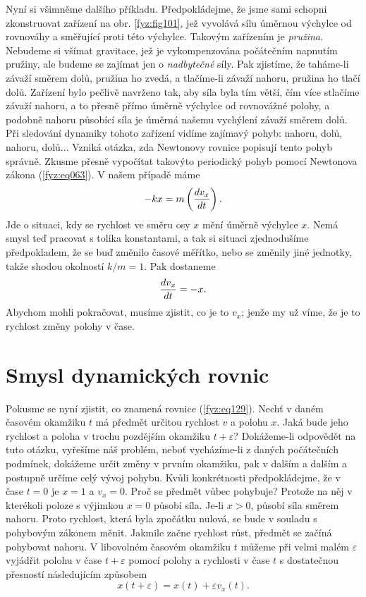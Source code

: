     Nyní si všimněme dalšího příkladu. Předpokládejme, že jsme sami schopni zkonstruovat zařízení na
    obr. \ref{fyz:fig101}, jež vyvolává sílu úměrnou výchylce od rovnováhy a směřující proti této 
    výchylce. Takovým zařízením je \emph{pružina}. Nebudeme si všímat gravitace, jež je 
    vykompenzována počátečním napnutím pružiny, ale budeme se zajímat jen o \emph{nadbytečné} síly. 
    Pak zjistíme, že taháme-li závaží směrem dolů, pružina ho zvedá, a tlačíme-li závaží nahoru, 
    pružina ho tlačí dolů. Zařízení bylo pečlivě navrženo tak, aby síla byla tím větší, čím více 
    stlačíme závaží nahoru, a to přesně přímo úměrně výchylce od rovnovážné polohy, a podobně 
    nahoru působící síla je úměrná našemu vychýlení závaží směrem dolů. Při sledování dynamiky 
    tohoto zařízení vidíme zajímavý pohyb: nahoru, dolů, nahoru, dolů... Vzniká otázka, zda 
    Newtonovy rovnice popisují tento pohyb správně. Zkusme přesně vypočítat takovýto periodický 
    pohyb pomocí Newtonova zákona (\ref{fyz:eq063}). V našem případě máme
    \begin{equation}\label{fyz:eq128}
      -kx = m\left(\dfrac{d v_x}{d t}\right).
    \end{equation}
    Jde o situaci, kdy se rychlost ve směru osy \(x\) mění úměrně výchylce \(x\). Nemá smysl teď 
    pracovat s tolika konstantami, a tak si situaci zjednodušíme předpokladem, že se buď změnilo 
    časové měřítko, nebo se změnily jiné jednotky, takže shodou okolností \(k/m = 1\). Pak dostaneme
    \begin{equation}\label{fyz:eq129}
      \dfrac{d v_x}{d t} = -x.
    \end{equation}
    Abychom mohli pokračovat, musíme zjistit, co je to \(v_x\); jenže my už víme, že je to rychlost 
    změny polohy v čase.
    
  \section{Smysl dynamických rovnic}\label{fyz:IchapIXsecV}
    Pokusme se nyní zjistit, co znamená rovnice (\ref{fyz:eq129}). Nechť v daném časovém okamžiku 
    \(t\) má předmět určitou rychlost \(v\) a polohu \(x\). Jaká bude jeho rychlost a poloha v 
    trochu pozdějším okamžiku \(t+\varepsilon\)? Dokážeme-li odpovědět na tuto otázku, vyřešíme náš 
    problém, neboť vycházíme-li z daných počátečních podmínek, dokážeme určit změny v prvním 
    okamžiku, pak v dalším a dalším a postupně určíme celý vývoj pohybu. Kvůli konkrétnosti 
    předpokládejme, že v čase \(t = 0\) je \(x= 1\) a \(v_x = 0\). Proč se předmět vůbec pohybuje? 
    Protože na něj v kterékoli poloze s výjimkou \(x=0\) působí síla. Je-li \(x > 0\), působí síla 
    směrem nahoru. Proto rychlost, která byla zpočátku nulová, se bude v souladu s pohybovým 
    zákonem měnit. Jakmile začne rychlost růst, předmět se začíná pohybovat nahoru. V libovolném 
    časovém okamžiku \(t\) můžeme při velmi malém \(\varepsilon\) vyjádřit polohu v čase \(t + 
    \varepsilon\) pomocí polohy a rychlosti v čase \(t\) s dostatečnou přesností následujícím 
    způsobem
    \begin{equation}\label{fyz:eq130}
      x(t+\varepsilon) = x(t) + \varepsilon v_x(t).
    \end{equation}
    
